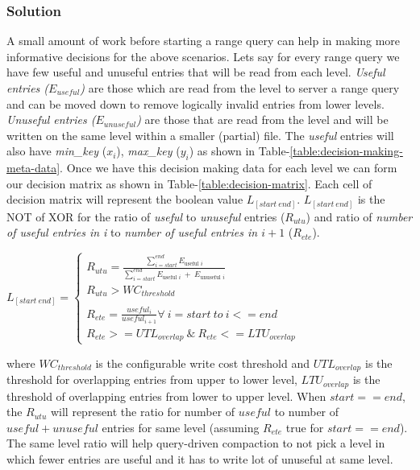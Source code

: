 \subsubsection{Solution}
A small amount of work before starting a range query can help in making more informative decisions for the above 
scenarios. Lets say for every range query we have few useful and unuseful entries that will be read from each level. 
\textit{Useful entries ($E_{useful}$)} are those which are read from the level to server a range query and can be moved down to 
remove logically invalid entries from lower levels. \textit{Unuseful entries ($E_{unuseful}$)} are those that are read 
from the level and will be written on the same level within a smaller (partial) file. The \textit{useful} entries will also 
have \textit{min\_key} (\textit{$x_i$}), \textit{max\_key} (\textit{$y_i$})%
as shown in Table-\ref{table:decision-making-meta-data}. Once we have this decision making data for each level we can 
form our decision matrix as shown in Table-\ref{table:decision-matrix}. Each cell of decision matrix will represent the 
boolean value $L_{[start\ end]}$. $L_{[start\ end]}$ is the NOT of XOR for the ratio of \textit{useful} to \textit{unuseful} 
entries ($R_{utu}$) and ratio of \textit{number of useful entries in i} to \textit{number of useful entries in $i+1$} ($R_{ete}$).
\hfill
\begin{center}
\begin{math}
    L_{[start\ end]}=\left\{
      \begin{array}{ll}
        R_{utu} = \frac{\sum_{i=start}^{end} E_{\text{useful }i}}{\sum_{i=start}^{end} {E_{\text{useful }i}\ +\ E_{\text{unuseful }i}}}\\
        R_{utu} > WC_{threshold}\\\\
        R_{ete} = \frac{useful_{i}}{useful_{i+1}} \forall\ i=start\ to\ i<=end\\
        R_{ete} >= UTL_{overlap}\ \&\ R_{ete} <= LTU_{overlap}
      \end{array}
    \right.
  \end{math}
\end{center}
\hfill \break
where \textit{$WC_{threshold}$} is the configurable write cost threshold and \textit{$UTL_{overlap}$} is the threshold for 
overlapping entries from upper to lower level, \textit{$LTU_{overlap}$} is the threshold of overlapping entries from 
lower to upper level. When $start == end$, the \textit{$R_{utu}$} will represent the ratio for number of $useful$ to 
number of $useful + unuseful$ entries for same level (assuming \textit{$R_{ete}$} true for $start == end$). The same level ratio will help query-driven compaction to not pick 
a level in which fewer entries are useful and it has to write lot of unuseful at same level.


